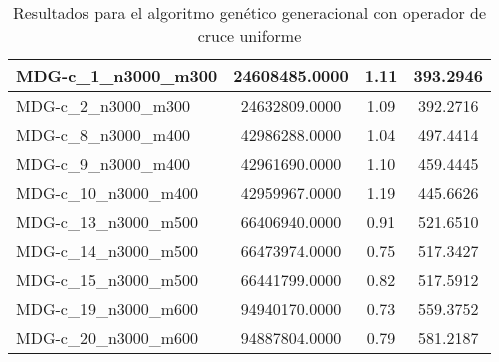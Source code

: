 \documentclass[10pt,a4paper]{article}
\begin{document}
\begin{table}[H]
\begin{center}
\begin{tabular}{|l|c|c|c|}
		MDG-c\_1\_n3000\_m300 & 24608485.0000 & 1.11 & 393.2946 \\ \hline
		MDG-c\_2\_n3000\_m300 & 24632809.0000 & 1.09 & 392.2716 \\ \hline
		MDG-c\_8\_n3000\_m400 & 42986288.0000 & 1.04 & 497.4414 \\ \hline
		MDG-c\_9\_n3000\_m400 & 42961690.0000 & 1.10 & 459.4445 \\ \hline
		MDG-c\_10\_n3000\_m400 & 42959967.0000 & 1.19 & 445.6626 \\ \hline
		MDG-c\_13\_n3000\_m500 & 66406940.0000 & 0.91 & 521.6510 \\ \hline
		MDG-c\_14\_n3000\_m500 & 66473974.0000 & 0.75 & 517.3427 \\ \hline
		MDG-c\_15\_n3000\_m500 & 66441799.0000 & 0.82 & 517.5912 \\ \hline
		MDG-c\_19\_n3000\_m600 & 94940170.0000 & 0.73 & 559.3752 \\ \hline
		MDG-c\_20\_n3000\_m600 & 94887804.0000 & 0.79 & 581.2187 \\ \hline
	\end{tabular}
	\caption{Resultados para el algoritmo genético generacional con operador de cruce uniforme}
	\label{}
	\end{center}
\end{table}

\newpage
\end{document}
